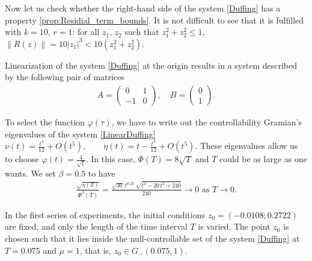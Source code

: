 \documentclass[../main.tex]{subfiles}
\begin{document}
Now let us check whether the right-hand side of the system \eqref{Duffing} has a property \ref{prop:Residial_term_bounds}. It is not difficult to see that it is fulfilled with $k = 10$, $r = 1$: for all $z_1$, $z_2$ such that $z_1^2+z_2^2 \leqslant 1$, $\|R(z)\| = 10|z_1|^3 < 10 (z_1^2+z_2^2)$.

Linearization of the system \eqref{Duffing} at the origin results in a system described by the following pair of matrices
\begin{gather}\label{LinearDuffing}
A = \begin{pmatrix} 0 & 1\\
                    -1 & 0
    \end{pmatrix}, \quad B = \begin{pmatrix}
    0\\
    1
    \end{pmatrix}.
\end{gather}

To select the function $\varphi(\tau)$, we have to write out the controllability Gramian's eigenvalues of the system \eqref{LinearDuffing}
    $\nu(t) = \frac{t^3}{12} + O(t^5), \qquad \eta(t) = t - \frac{t^3}{12}+ O(t^5)$.
These eigenvalues allow us to choose $\varphi(t) = \frac{4}{\sqrt{t}}$. In this case, $\Phi(T) = 8\sqrt{T}$ and $\overline{T}$ could be as large as one wants. We set $\beta = 0.5$ to have 
\begin{gather*}
    \frac{\sqrt{\eta(T)}}{\Phi^\beta(T)} =  \frac{\sqrt{30}\,t^{0.25}\,\sqrt{t^4-20\,t^2+240}}{240} \to 0  \mbox{ as } T \to 0.
\end{gather*} 

In the first series of experiments, the initial conditions $z_0 = (-0.0108; 0.2722)$ 
are fixed, and only the length of the time interval $T$ is varied. The point $ z_0 
$ is chosen such that it lies inside the null-controllable set of the system 
\eqref{Duffing} at $T = 0.075$ and $\mu = 1$, that is, $z_0 \in G_{-}(0.075,1)$.
\end{document}
